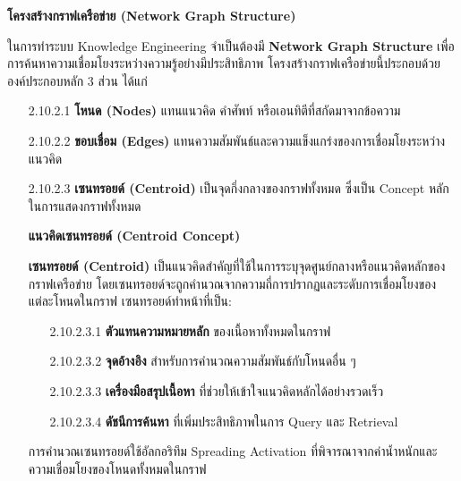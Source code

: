\documentclass[12pt,a4paper]{article}
\begin{document}
\begin{enumerate}[leftmargin=2cm]
\begin{enumerate}
{            \vspace{0.5cm}

            \textbf{โครงสร้างกราฟเครือข่าย (Network Graph Structure)}

            \hspace{1cm}ในการทำระบบ Knowledge Engineering จำเป็นต้องมี \textbf{Network Graph Structure} เพื่อการค้นหาความเชื่อมโยงระหว่างความรู้อย่างมีประสิทธิภาพ โครงสร้างกราฟเครือข่ายนี้ประกอบด้วยองค์ประกอบหลัก 3 ส่วน ได้แก่

            \begin{enumerate}
                \item[2.10.2.1] \textbf{โหนด (Nodes)} แทนแนวคิด คำศัพท์ หรือเอนทิตีที่สกัดมาจากข้อความ
                \item[2.10.2.2] \textbf{ขอบเชื่อม (Edges)} แทนความสัมพันธ์และความแข็งแกร่งของการเชื่อมโยงระหว่างแนวคิด
                \item[2.10.2.3] \textbf{เซนทรอยด์ (Centroid)} เป็นจุดกึ่งกลางของกราฟทั้งหมด ซึ่งเป็น Concept หลักในการแสดงกราฟทั้งหมด
                
                \vspace{0.3cm}

            \textbf{แนวคิดเซนทรอยด์ (Centroid Concept)}

            \hspace{1cm}\textbf{เซนทรอยด์ (Centroid)} เป็นแนวคิดสำคัญที่ใช้ในการระบุจุดศูนย์กลางหรือแนวคิดหลักของกราฟเครือข่าย โดยเซนทรอยด์จะถูกคำนวณจากความถี่การปรากฏและระดับการเชื่อมโยงของแต่ละโหนดในกราฟ เซนทรอยด์ทำหน้าที่เป็น:

            \begin{enumerate}
                \item[2.10.2.3.1] \textbf{ตัวแทนความหมายหลัก} ของเนื้อหาทั้งหมดในกราฟ
                \item[2.10.2.3.2] \textbf{จุดอ้างอิง} สำหรับการคำนวณความสัมพันธ์กับโหนดอื่น ๆ
                \item[2.10.2.3.3] \textbf{เครื่องมือสรุปเนื้อหา} ที่ช่วยให้เข้าใจแนวคิดหลักได้อย่างรวดเร็ว
                \item[2.10.2.3.4] \textbf{ดัชนีการค้นหา} ที่เพิ่มประสิทธิภาพในการ Query และ Retrieval
            \end{enumerate}

            การคำนวณเซนทรอยด์ใช้อัลกอริทึม Spreading Activation ที่พิจารณาจากค่าน้ำหนักและความเชื่อมโยงของโหนดทั้งหมดในกราฟ

            \vspace{0.3cm}


\end{enumerate}}
\end{enumerate}
\end{enumerate}
\end{document}
